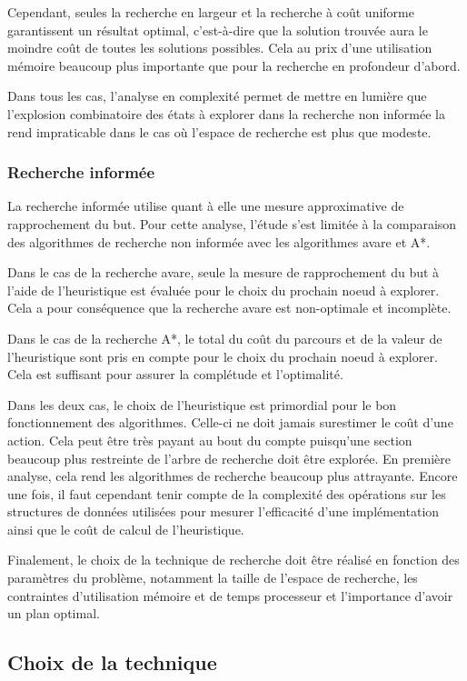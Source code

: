 \documentclass[12pt,english,frenchb,letterpaper]{article}
\begin{document}
Cependant, seules la recherche en largeur et la recherche à coût uniforme garantissent un résultat optimal, c'est-à-dire que la solution trouvée aura le moindre coût de toutes les solutions possibles. Cela au prix d'une utilisation mémoire beaucoup plus importante que pour la recherche en profondeur d'abord.

Dans tous les cas, l'analyse en complexité permet de mettre en lumière que l'explosion combinatoire des états à explorer dans la recherche non informée la rend impraticable dans le cas où l'espace de recherche est plus que modeste.  

\subsubsection{Recherche informée}
La recherche informée utilise quant à elle une mesure approximative de rapprochement du but. Pour cette analyse, l'étude s'est limitée à la comparaison des algorithmes de recherche non informée avec les algorithmes avare et A*.

Dans le cas de la recherche avare, seule la mesure de rapprochement du but à l'aide de l'heuristique est évaluée pour le choix du prochain noeud à explorer.  Cela a pour conséquence que la recherche avare est non-optimale et incomplète.

Dans le cas de la recherche A*, le total du coût du parcours et de la valeur de l'heuristique sont pris en compte pour le choix du prochain noeud à explorer.  Cela est suffisant pour assurer la complétude et l'optimalité.

Dans les deux cas, le choix de l'heuristique est primordial pour le bon fonctionnement des algorithmes.  Celle-ci ne doit jamais surestimer le coût d'une action.  Cela peut être très payant au bout du compte puisqu'une section beaucoup plus restreinte de l'arbre de recherche doit être explorée.  En première analyse, cela rend les algorithmes de recherche beaucoup plus attrayante.  Encore une fois, il faut cependant tenir compte de la complexité des opérations sur les structures de données utilisées pour mesurer l'efficacité d'une implémentation ainsi que le coût de calcul de l'heuristique.  

Finalement, le choix de la technique de recherche doit être réalisé en fonction des paramètres du problème, notamment la taille de l'espace de recherche, les contraintes d'utilisation mémoire et de temps processeur et l'importance d'avoir un plan optimal. 


\subsection{Choix de la technique}
\end{document}
